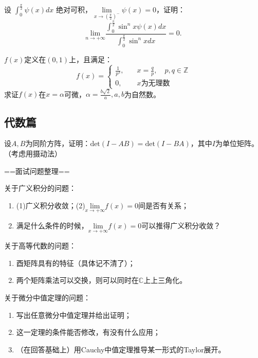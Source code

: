 \begin{example}
    设 $\displaystyle\int_0^\frac{\pi}{2}\psi(x)dx$ 绝对可积，$\lim\limits_{x\to (\frac{\pi}{2})^-}\psi{(x)}=0$，证明：
    $$
    \underset{n\to +\infty}{\text{lim}}\frac{\displaystyle\int_0^\frac{\pi}{2}\sin^nx\psi(x)dx}{\displaystyle\int_0^\frac{\pi}{2}\sin^nxdx}=0.
    $$
\end{example}

\begin{example}
$f(x)$定义在$(0,1)$上，且满足：
    \[f(x)=\left\{
    \begin{aligned}
        \frac{1}{p^3},\quad &x=\frac{q}{p},\quad p,q\in\mathbb{Z}\\
        0,\quad& x\text{为无理数}
    \end{aligned}
    \right.\]
求证$f(x)$在$x=\alpha$可微，$\displaystyle\alpha=\frac{b\sqrt{2}}{a},a,b$为自然数。
\end{example}
\subsection{代数篇}
\begin{example}
    设$A,B$为同阶方阵，证明：$\text{det}(I-AB)=\text{det}(I-BA)$，其中$I$为单位矩阵。（考虑用摄动法）
\end{example}

==面试问题整理==
\begin{example}[问题组1]关于广义积分的问题：
\begin{enumerate}
    \item (1)广义积分收敛；(2)$\underset{x\to +\infty}{\text{lim}}f(x)=0$间是否有关系；
    \item 满足什么条件的时候，$\underset{x\to +\infty}{\text{lim}}f(x)=0$可以推得广义积分收敛？
\end{enumerate}
\end{example}

\begin{example}[问题组2]关于高等代数的问题：
\begin{enumerate}
    \item 酉矩阵具有的特征（具体记不清了）；
    \item 两个矩阵乘法可以交换，则可以同时在$\mathbb{C}$上上三角化。
\end{enumerate}
\end{example}

\begin{example}[问题组3]关于微分中值定理的问题：
\begin{enumerate}
    \item 写出任意微分中值定理并给出证明；
    \item 这一定理的条件能否修改，有没有什么应用；
    \item （在回答基础上）用Cauchy中值定理推导某一形式的Taylor展开。
\end{enumerate}
\end{example}

